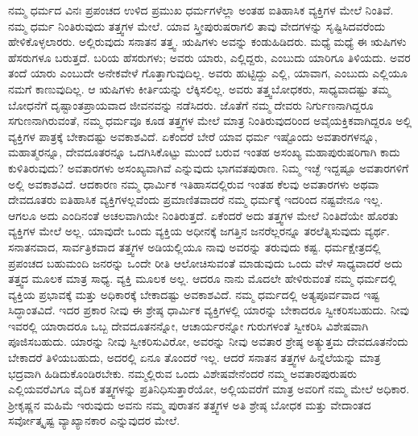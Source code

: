 ನಮ್ಮ ಧರ್ಮದ ವಿನಃ ಪ್ರಪಂಚದ ಉಳಿದ ಪ್ರಮುಖ ಧರ್ಮಗಳೆಲ್ಲಾ ಅಂತಹ ಐತಿಹಾಸಿಕ ವ್ಯಕ್ತಿಗಳ ಮೇಲೆ ನಿಂತಿವೆ. ನಮ್ಮ ಧರ್ಮ ನಿಂತಿರುವುದು ತತ್ತ್ವಗಳ ಮೇಲೆ. ಯಾವ ಸ್ತ್ರೀಪುರುಷರಾಗಲಿ ತಾವು ವೇದಗಳನ್ನು ಸೃಷ್ಟಿಸಿದವರೆಂದು ಹೇಳಿಕೊಳ್ಳಲಾರರು. ಅಲ್ಲಿರುವುದು ಸನಾತನ ತತ್ತ್ವ. ಋಷಿಗಳು ಅವನ್ನು ಕಂಡು\-ಹಿಡಿದರು. ಮಧ್ಯೆ ಮಧ್ಯೆ ಈ ಋಷಿಗಳು ಹೆಸರುಗಳೂ ಬರುತ್ತದೆ. ಬರಿಯ ಹೆಸರುಗಳು; ಅವರು ಯಾರು, ಎಲ್ಲಿದ್ದರು, ಎಂಬುದು ಯಾರಿಗೂ ತಿಳಿಯದು. ಅವರ ತಂದೆ ಯಾರು ಎಂಬುದೇ ಅನೇಕವೇಳೆ ಗೊತ್ತಾಗುವುದಿಲ್ಲ. ಅವರು ಹುಟ್ಟಿದ್ದು ಎಲ್ಲಿ, ಯಾವಾಗ, ಎಂಬುದು ಎಲ್ಲಿಯೂ ನಮಗೆ ಕಾಣುವುದಿಲ್ಲ. ಆ ಋಷಿಗಳು ಕೀರ್ತಿಯನ್ನು ಲೆಕ್ಕಿಸಲಿಲ್ಲ. ಅವರು ತತ್ತ್ವಬೋಧಕರು, ಸಾಧ್ಯವಾದಷ್ಟು ತಮ್ಮ ಬೋಧನೆಗೆ ದೃಷ್ಟಾಂತಪ್ರಾಯವಾದ ಜೀವನವನ್ನು ನಡೆಸಿದರು. ಜೊತೆಗೆ ನಮ್ಮ ದೇವರು ನಿರ್ಗುಣನಾಗಿದ್ದರೂ ಸಗುಣನಾಗಿರುವಂತೆ, ನಮ್ಮ ಧರ್ಮವೂ ಕೂಡ ತತ್ತ್ವಗಳ ಮೇಲೆ ಮಾತ್ರ ನಿಂತಿರುವುದರಿಂದ ಅವೈಯಕ್ತಿಕವಾಗಿದ್ದರೂ ಅಲ್ಲಿ ವ್ಯಕ್ತಿಗಳ ಪಾತ್ರಕ್ಕೆ ಬೇಕಾದಷ್ಟು ಅವಕಾಶವಿದೆ. ಏಕೆಂದರೆ ಬೇರೆ ಯಾವ ಧರ್ಮ ಇಷ್ಟೊಂದು ಅವತಾರಗಳನ್ನೂ, ಮಹಾತ್ಮರನ್ನೂ, ದೇವದೂತರನ್ನೂ ಒದಗಿಸಿಕೊಟ್ಟು ಮುಂದೆ ಬರುವ ಇಂತಹ ಅಸಂಖ್ಯ ಮಹಾಪುರುಷರಿಗಾಗಿ ಕಾದು ಕುಳಿತಿರುವುದು? ಅವತಾರಗಳು ಅಸಂಖ್ಯವಾಗಿವೆ ಎನ್ನುವುದು ಭಾಗವತಪುರಾಣ. ನಿಮ್ಮ ಇಚ್ಛೆ ಇದ್ದಷ್ಟೂ ಅವತಾರಗಳಿಗೆ ಅಲ್ಲಿ ಅವಕಾಶವಿದೆ. ಆದಕಾರಣ ನಮ್ಮ ಧಾರ್ಮಿಕ ಇತಿಹಾಸದಲ್ಲಿರುವ ಇಂತಹ ಕೆಲವು ಅವತಾರಗಳು ಅಥವಾ ದೇವದೂತರು ಐತಿಹಾಸಿಕ ವ್ಯಕ್ತಿಗಳಲ್ಲವೆಂದು ಪ್ರಮಾಣಿತವಾದರೆ ನಮ್ಮ ಧರ್ಮಕ್ಕೆ ಇದರಿಂದ ನಷ್ಟವೇನೂ ಇಲ್ಲ. ಆಗಲೂ ಅದು ಎಂದಿನಂತೆ ಅಚಲವಾಗಿಯೇ ನಿಂತಿರುತ್ತದೆ. ಏಕೆಂದರೆ ಅದು ತತ್ತ್ವಗಳ ಮೇಲೆ ನಿಂತಿದೆಯೇ ಹೊರತು ವ್ಯಕ್ತಿಗಳ ಮೇಲೆ ಅಲ್ಲ. ಯಾವುದೇ ಒಂದು ವ್ಯಕ್ತಿಯ ಅಧೀನಕ್ಕೆ ಜಗತ್ತಿನ ಜನರೆಲ್ಲರನ್ನೂ ತರಲೆತ್ನಿಸುವುದು ವ್ಯರ್ಥ. ಸನಾತನವಾದ, ಸಾರ್ವತ್ರಿಕವಾದ ತತ್ತ್ವಗಳ ಅಡಿಯಲ್ಲಿಯೂ ನಾವು ಅವರನ್ನು ತರುವುದು ಕಷ್ಟ. ಧರ್ಮಕ್ಷೇತ್ರದಲ್ಲಿ ಪ್ರಪಂಚದ ಬಹುಮಂದಿ ಜನರನ್ನು ಒಂದೇ ರೀತಿ ಆಲೋಚಿಸುವಂತೆ ಮಾಡುವುದು ಒಂದು ವೇಳೆ ಸಾಧ್ಯವಾದರೆ ಅದು ತತ್ತ್ವದ ಮೂಲಕ ಮಾತ್ರ ಸಾಧ್ಯ. ವ್ಯಕ್ತಿ ಮೂಲಕ ಅಲ್ಲ. ಆದರೂ ನಾನು ಮೊದಲೇ ಹೇಳಿರುವಂತೆ ನಮ್ಮ ಧರ್ಮದಲ್ಲಿ ವ್ಯಕ್ತಿಯ ಪ್ರಭಾವಕ್ಕೆ ಮತ್ತು ಅಧಿಕಾರಕ್ಕೆ ಬೇಕಾದಷ್ಟು ಅವಕಾಶವಿದೆ. ನಮ್ಮ ಧರ್ಮದಲ್ಲಿ ಅತ್ಯಪೂರ್ವವಾದ ಇಷ್ಟ ಸಿದ್ಧಾಂತವಿದೆ. ಇದರ ಪ್ರಕಾರ ನೀವು ಈ ಶ್ರೇಷ್ಠ ಧಾರ್ಮಿಕ ವ್ಯಕ್ತಿಗಳಲ್ಲಿ ಯಾರನ್ನು ಬೇಕಾದರೂ ಸ್ವೀಕರಿಸಬಹುದು. ನೀವು ಇವರಲ್ಲಿ ಯಾರಾದರೂ ಒಬ್ಬ ದೇವದೂತನನ್ನೋ, ಆಚಾರ್ಯರನ್ನೋ ಗುರುಗಳಂತೆ ಸ್ವೀಕರಿಸಿ ವಿಶೇಷವಾಗಿ ಪೂಜಿಸಬಹುದು. ಯಾರನ್ನು ನೀವು ಸ್ವೀಕರಿಸುವಿರೋ, ಅವರನ್ನು ನೀವು ಅವತಾರ ಶ್ರೇಷ್ಠ ಅತ್ಯುತ್ತಮ ದೇವದೂತನೆಂದು ಬೇಕಾದರೆ ತಿಳಿಯಬಹುದು, ಅದರಲ್ಲಿ ಏನೂ ತೊಂದರೆ ಇಲ್ಲ. ಆದರೆ ಸನಾತನ ತತ್ತ್ವಗಳ ಹಿನ್ನೆಲೆಯನ್ನು ಮಾತ್ರ ಭದ್ರವಾಗಿ ಹಿಡಿದುಕೊಂಡಿರಬೇಕು. ನಮ್ಮಲ್ಲಿರುವ ಒಂದು ವಿಶೇಷವೇನೆಂದರೆ ನಮ್ಮ ಅವತಾರಪುರುಷರು ಎಲ್ಲಿಯವರೆವಿಗೂ ವೈದಿಕ ತತ್ತ್ವಗಳನ್ನು ಪ್ರತಿನಿಧಿಸುತ್ತಾರೆಯೋ, ಅಲ್ಲಿಯವರೆಗೆ ಮಾತ್ರ ಅವರಿಗೆ ನಮ್ಮ ಮೇಲೆ ಅಧಿಕಾರ. ಶ‍್ರೀಕೃಷ್ಣನ ಮಹಿಮೆ ಇರುವುದು ಅವನು ನಮ್ಮ ಪುರಾತನ ತತ್ತ್ವಗಳ ಅತಿ ಶ್ರೇಷ್ಠ ಬೋಧಕ ಮತ್ತು ವೇದಾಂತದ ಸರ್ವೋತ್ಕೃಷ್ಟ ವ್ಯಾಖ್ಯಾನಕಾರ ಎನ್ನುವುದರ ಮೇಲೆ. 

